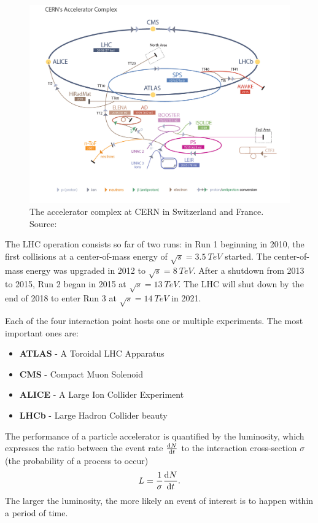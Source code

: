 \begin{figure}[H]
    \centering
    \includegraphics[width=17cm]{assets/chap02/lhc.jpg}
    \caption{The accelerator complex at CERN in Switzerland and France. Source: \cite{Marcastel:1621583}}
\end{figure}

The LHC operation consists so far of two runs: in Run 1 beginning in 2010, the first collisions at a center-of-mass energy of $\sqrt{s}=\SI{3.5}{TeV}$ started. The center-of-mass energy was upgraded in 2012 to $\sqrt{s}=\SI{8}{TeV}$. After a shutdown from 2013 to 2015, Run 2 began in 2015 at $\sqrt{s}=\SI{13}{TeV}$. The LHC will shut down by the end of 2018 to enter Run 3 at $\sqrt{s}=\SI{14}{TeV}$ in 2021.

Each of the four interaction point hosts one or multiple experiments. The most important ones are:
\begin{itemize}
\item \textbf{ATLAS} - A Toroidal LHC Apparatus
\item \textbf{CMS} - Compact Muon Solenoid
\item \textbf{ALICE} - A Large Ion Collider Experiment
\item \textbf{LHCb} - Large Hadron Collider beauty
\end{itemize}

The performance of a particle accelerator is quantified by the luminosity, which expresses the ratio between the event rate $\dv{N}{t}$ to the interaction cross-section $\sigma$ (the probability of a process to occur)
\begin{equation}
    L=\frac{1}{\sigma} \dv{N}{t}.
\end{equation}
The larger the luminosity, the more likely an event of interest is to happen within a period of time.

